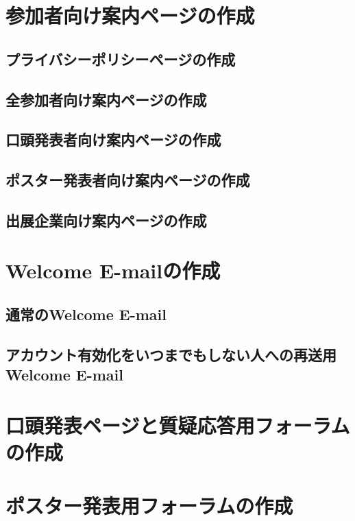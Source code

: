 \documentclass[titlepage,10pt,a4paper,uplatex]{jsbook}
\begin{document}
\section{参加者向け案内ページの作成}

\subsection{プライバシーポリシーページの作成}

\subsection{全参加者向け案内ページの作成}

\subsection{口頭発表者向け案内ページの作成}

\subsection{ポスター発表者向け案内ページの作成}

\subsection{出展企業向け案内ページの作成}

\section{Welcome E-mailの作成}

\subsection{通常のWelcome E-mail}

\subsection{アカウント有効化をいつまでもしない人への再送用Welcome E-mail}

\section{口頭発表ページと質疑応答用フォーラムの作成}

\section{ポスター発表用フォーラムの作成}
\end{document}
